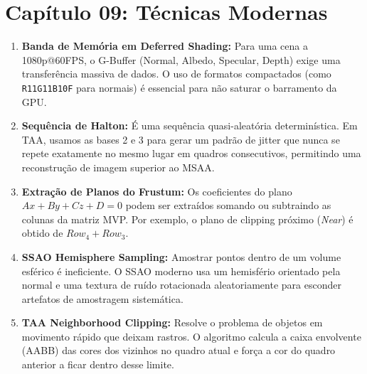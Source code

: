 \section*{Capítulo 09: Técnicas Modernas}
\begin{enumerate}
    \item \textbf{Banda de Memória em Deferred Shading:} Para uma cena a 1080p@60FPS, o G-Buffer (Normal, Albedo, Specular, Depth) exige uma transferência massiva de dados. O uso de formatos compactados (como \texttt{R11G11B10F} para normais) é essencial para não saturar o barramento da GPU.
    \item \textbf{Sequência de Halton:} É uma sequência quasi-aleatória determinística. Em TAA, usamos as bases 2 e 3 para gerar um padrão de jitter que nunca se repete exatamente no mesmo lugar em quadros consecutivos, permitindo uma reconstrução de imagem superior ao MSAA.
    \item \textbf{Extração de Planos do Frustum:} Os coeficientes do plano $Ax + By + Cz + D = 0$ podem ser extraídos somando ou subtraindo as colunas da matriz MVP. Por exemplo, o plano de clipping próximo (\textit{Near}) é obtido de $Row_4 + Row_3$.
    \item \textbf{SSAO Hemisphere Sampling:} Amostrar pontos dentro de um volume esférico é ineficiente. O SSAO moderno usa um hemisfério orientado pela normal e uma textura de ruído rotacionada aleatoriamente para esconder artefatos de amostragem sistemática.
    \item \textbf{TAA Neighborhood Clipping:} Resolve o problema de objetos em movimento rápido que deixam rastros. O algoritmo calcula a caixa envolvente (AABB) das cores dos vizinhos no quadro atual e força a cor do quadro anterior a ficar dentro desse limite.
\end{enumerate}

